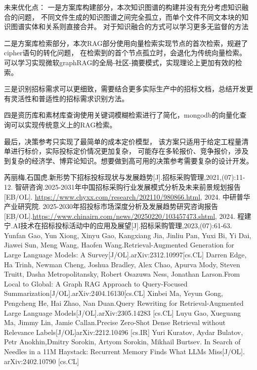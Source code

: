 \documentclass{xmu}
\begin{document}
未来优化点：
一是方案库构建部分，本次知识图谱的构建并没有充分考虑知识融合的问题，
不同文件生成的知识图谱之间完全孤立，而单个文件不同文本块的知识图谱实体和关系则直接合并。
对于知识融合的方式可以学习更多无监督的方法

二是方案库检索部分，本次RAG部分使用向量检索实现节点的首次检索，规避了cipher语句的转化问题，
在检索到的首个节点孤立时，会退化为传统向量检索。
可以学习实现微软graphRAG的全局-社区-摘要模式，实现理论上更加有效的检索。

三是识别招标需求可以更细致，需要结合更多实际生产中的招标文档，总结开发更有灵活性和普适性的招标需求识别方法。

四是资历库和素材库查询使用关键词模糊检索进行了简化，mongodb的向量化查询可以实现传统意义上的RAG检索。

最后，决策参考只实现了最简单的成本定价模型，
该方案只适用于给定工程量清单进行标价，实际投标定价情况更加复杂，
可能存在多轮报价、竞争报价，涉及到复杂的经济学、博弈论知识。想要做到高可用的决策参考需要复杂的设计开发。

\begin{reference}
    \begin{thebibliography}{5}
        芮丽梅,石国虎.新形势下招标投标现状与发展趋势[J].招标采购管理,2021,(07):11-12.
        智研咨询.2025-2031年中国招标采购行业发展模式分析及未来前景规划报告[EB/OL]. \url{https://www.chyxx.com/research/202110/980866.html}, 2024.
        中研普华产业研究院.
            2025-2030年招投标市场深度分析及发展趋势研究咨询报告[EB/OL].\url{https://www.chinairn.com/news/20250220/103457473.shtml}, 2024.
        程建宁.AI技术在招标投标活动中的应用及展望[J].招标采购管理,2023,(07):61-63.
        Yunfan Gao, Yun Xiong, Xinyu Gao, Kangxiang Jia, Jinliu Pan, Yuxi Bi, Yi Dai, Jiawei Sun, Meng Wang, Haofen Wang.Retrieval-Augmented Generation for Large Language Models: A Survey[J/OL].arXiv:2312.10997[cs.CL]
        Darren Edge, Ha Trinh, Newman Cheng, Joshua Bradley, Alex Chao, Apurva Mody, Steven Truitt, Dasha Metropolitansky, Robert Osazuwa Ness, Jonathan Larson.From Local to Global: A Graph RAG Approach to Query-Focused Summarization[J/OL].arXiv:2404.16130[cs.CL]
        Xinbei Ma, Yeyun Gong, Pengcheng He, Hai Zhao, Nan Duan.Query Rewriting for Retrieval-Augmented Large Language Models[J/OL].arXiv:2305.14283 [cs.CL]
        Luyu Gao, Xueguang Ma, Jimmy Lin, Jamie Callan.Precise Zero-Shot Dense Retrieval without Relevance Labels[J/OL]arXiv:2212.10496 [cs.IR]
        Yuri Kuratov, Aydar Bulatov, Petr Anokhin,Dmitry Sorokin, Artyom Sorokin, Mikhail Burtsev.
            In Search of Needles in a 11M Haystack: Recurrent Memory Finds What LLMs Miss[J/OL].
            arXiv:2402.10790 [cs.CL]
    \end{thebibliography}
\end{reference}
\end{document}

